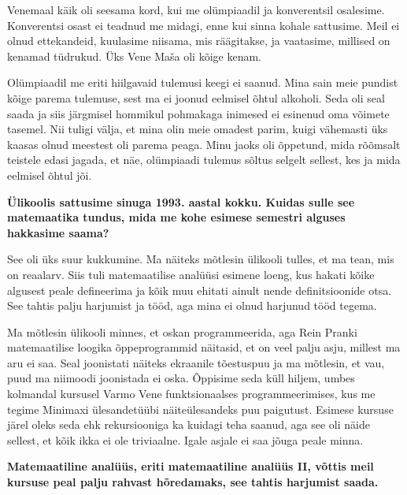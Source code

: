 Venemaal käik oli seesama
kord, kui me olümpiaadil ja konverentsil osalesime. Konverentsi osast ei teadnud
me midagi, enne kui sinna kohale sattusime. Meil ei olnud 
ettekandeid, kuulasime niisama, mis räägitakse, ja vaatasime, millised on
kenamad tüdrukud. Üks Vene Maša oli kõige kenam.

Olümpiaadil me eriti hiilgavaid tulemusi keegi ei saanud. Mina sain meie
pundist kõige parema tulemuse, sest ma ei joonud eelmisel õhtul alkoholi. Seda
oli seal saada ja siis järgmisel hommikul pohmakaga inimesed ei esinenud oma
võimete tasemel. Nii tuligi välja, et mina olin meie omadest parim, kuigi
vähemasti üks kaasas olnud meestest oli parema peaga. Minu jaoks oli õppetund,
mida rõõmsalt teistele edasi jagada, et näe, olümpiaadi tulemus sõltus selgelt
sellest, kes ja mida eelmisel õhtul jõi.

\pagebreak[4]
\textbf{Ülikoolis sattusime sinuga 1993. aastal kokku.
Kuidas sulle see matemaatika tundus, mida me kohe esimese semestri alguses
hakkasime saama?}
 \nopagebreak[4]
 
See oli üks suur kukkumine. Ma näiteks mõtlesin ülikooli tulles, et ma tean,
mis on reaalarv. Siis tuli matemaatilise analüüsi esimene loeng, kus hakati
kõike algusest peale defineerima ja kõik muu ehitati
ainult nende definitsioonide otsa. See tahtis palju harjumist ja 
tööd, aga mina ei olnud harjunud tööd tegema.

Ma mõtlesin ülikooli minnes, et oskan programmeerida, aga Rein
Pranki matemaatilise loogika õppeprogrammid näitasid,
et on veel palju asju, millest ma aru ei saa. Seal joonistati näiteks ekraanile
tõestuspuu ja ma mõtlesin, et vau, puud ma niimoodi joonistada ei
oska. Õppisime seda küll hiljem, umbes kolmandal kursusel Varmo
Vene funktsionaalses programmeerimises, kus me tegime
Minimaxi ülesandetüübi näiteülesandeks puu paigutust. Esimese
kursuse järel oleks seda ehk rekursiooniga ka kuidagi teha saanud, aga see oli
näide sellest, et kõik ikka ei ole triviaalne. Igale asjale ei saa jõuga
peale minna.

\textbf{Matemaatiline analüüs, eriti matemaatiline analüüs II, võttis
meil kursuse peal palju rahvast hõredamaks, see tahtis harjumist saada.}


